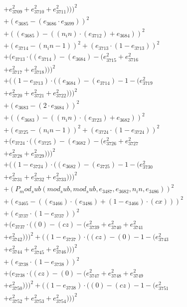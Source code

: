 \documentclass[10pt, a4paper]{article}
\begin{document}
\begin{align*}
& + e_{3709}^{2} + e_{3710}^{2} + e_{3711}^{2})))^{2} \\
& + (e_{3685} - (e_{3686}  \cdot  e_{3699}))^{2} \\
& + ((e_{3685}) - ((n_in)  \cdot  (e_{3712}) + e_{3684}))^{2} \\
& + (e_{3714} - (n_in - 1))^{2} + (e_{3713}  \cdot  (1 - e_{3713}))^{2} \\
& + (e_{3713}  \cdot  ((e_{3714}) - (e_{3684}) - (e_{3715}^{2} + e_{3716}^{2} \\
& + e_{3717}^{2} + e_{3718}^{2})))^{2} \\
& + ((1 - e_{3713})  \cdot  ((e_{3684}) - (e_{3714}) - 1 - (e_{3719}^{2} \\
& + e_{3720}^{2} + e_{3721}^{2} + e_{3722}^{2})))^{2} \\
& + (e_{3683} - (2  \cdot  e_{3684}))^{2} \\
& + ((e_{3683}) - ((n_in)  \cdot  (e_{3723}) + e_{3682}))^{2} \\
& + (e_{3725} - (n_in - 1))^{2} + (e_{3724}  \cdot  (1 - e_{3724}))^{2} \\
& + (e_{3724}  \cdot  ((e_{3725}) - (e_{3682}) - (e_{3726}^{2} + e_{3727}^{2} \\
& + e_{3728}^{2} + e_{3729}^{2})))^{2} \\
& + ((1 - e_{3724})  \cdot  ((e_{3682}) - (e_{3725}) - 1 - (e_{3730}^{2} \\
& + e_{3731}^{2} + e_{3732}^{2} + e_{3733}^{2})))^{2} \\
& + (P_mod_sub(mod_sub, mod_sub, e_{3487}, e_{3682}, n_in, e_{3486}))^{2} \\
& + (e_{3465} - ((e_{3466})  \cdot  (e_{3486}) + (1 - e_{3466})  \cdot  (cx)))^{2} \\
& + (e_{3737}  \cdot  (1 - e_{3737}))^{2} \\
& + (e_{3737}  \cdot  ((0) - (cz) - (e_{3739}^{2} + e_{3740}^{2} + e_{3741}^{2} \\
& + e_{3742}^{2})))^{2} + ((1 - e_{3737})  \cdot  ((cz) - (0) - 1 - (e_{3743}^{2} \\
& + e_{3744}^{2} + e_{3745}^{2} + e_{3746}^{2})))^{2} \\
& + (e_{3738}  \cdot  (1 - e_{3738}))^{2} \\
& + (e_{3738}  \cdot  ((cz) - (0) - (e_{3747}^{2} + e_{3748}^{2} + e_{3749}^{2} \\
& + e_{3750}^{2})))^{2} + ((1 - e_{3738})  \cdot  ((0) - (cz) - 1 - (e_{3751}^{2} \\
& + e_{3752}^{2} + e_{3753}^{2} + e_{3754}^{2})))^{2} \\

\end{align*}
\end{document}
